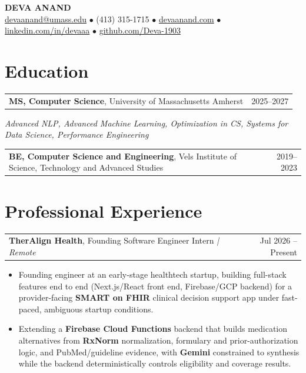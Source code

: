 \documentclass[letterpaper,11pt]{article}
\makeatletter
\newcommand{\eduItem}[3]{%
  \begin{tabular*}{\textwidth}{@{}l@{\extracolsep{\fill}}r@{}}
    \textbf{#1}, #2 & #3 \\
  \end{tabular*}\par
}
\newcommand{\expItem}[4]{%
  \vspace{2pt}
  \begin{tabular*}{\textwidth}{@{}l@{\extracolsep{\fill}}r@{}}
    \textbf{#1}, #2 \textit{| #3} & #4 \\
  \end{tabular*}\par\vspace{-3pt}
}
\makeatother
\begin{document}
\begin{center}
    {\fontsize{18}{20}\selectfont\bfseries DEVA ANAND}\\ \vspace{3pt}
    {\small
    \href{mailto:devaanand@umass.edu}{devaanand@umass.edu}
    \enspace$\bullet$\enspace
    (413) 315-1715
    \enspace$\bullet$\enspace
    \href{https://devaanand.com}{devaanand.com}
    \enspace$\bullet$\enspace
    \href{https://linkedin.com/in/devaaa/}{linkedin.com/in/devaaa}
    \enspace$\bullet$\enspace
    \href{https://github.com/Deva-1903}{github.com/Deva-1903}}
\end{center}
\vspace{-8pt}

\section{Education}
\eduItem{MS, Computer Science}{University of Massachusetts Amherst}{2025--2027}
{\small\textit{Advanced NLP, Advanced Machine Learning, Optimization in CS, Systems for Data Science, Performance Engineering}}\par
\vspace{3pt}
\eduItem{BE, Computer Science and Engineering}{Vels Institute of Science, Technology and Advanced Studies}{2019--2023}

\section{Professional Experience}

\expItem{TherAlign Health}{Founding Software Engineer Intern}{Remote}{Jul 2026 -- Present}
\begin{itemize}
  \item Founding engineer at an early-stage healthtech startup, building full-stack features end to end (Next.js/React front end, Firebase/GCP backend) for a provider-facing \textbf{SMART on FHIR} clinical decision support app under fast-paced, ambiguous startup conditions.
  \item Extending a \textbf{Firebase Cloud Functions} backend that builds medication alternatives from \textbf{RxNorm} normalization, formulary and prior-authorization logic, and PubMed/guideline evidence, with \textbf{Gemini} constrained to synthesis while the backend deterministically controls eligibility and coverage results.
\end{itemize}
\end{document}
